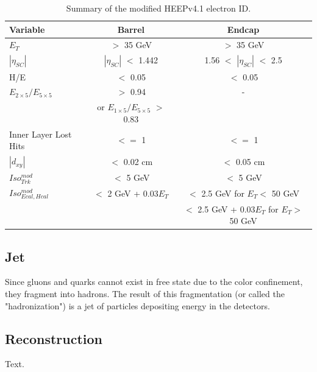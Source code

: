 \begin{table}[hbtp]
  \begin{center}
    \begin{tabular}{|l|c|c|}
      \hline
      Variable & Barrel & Endcap \\\hline
      $E_{T}$ & $>$ 35 GeV & $>$ 35 GeV \\
      $|\eta_{SC}|$ & $|\eta_{SC}|$ $<$ 1.442 & 1.56 $<$ $|\eta_{SC}|$ $<$ 2.5 \\
      H/E & $<$ 0.05 & $<$ 0.05 \\ 
      $E_{2\times5}/E_{5\times5}$ & $>$ 0.94 & - \\
      & or $E_{1\times5}/E_{5\times5}$ $>$ 0.83 & \\ 
      Inner Layer Lost Hits & $<=$ 1 & $<=$ 1 \\
      $|d_{xy}|$ & $<$ 0.02 cm & $<$ 0.05 cm\\
      \hline
      $Iso_{Trk}^{mod}$  & $<$ 5 GeV& $<$ 5 GeV\\
      \hline
      $Iso_{Ecal, Hcal}^{mod}$  & $<$ 2 GeV + 0.03$E_{T}$ & $<$ 2.5 GeV for $E_{T} <$ 50 GeV \\
      & & $<$ 2.5 GeV + 0.03$E_{T}$ for $E_{T} >$ 50 GeV \\
      \hline
    \end{tabular}
    \caption{\label{tab:EleIDtable} Summary of the modified HEEPv4.1 electron ID.}
  \end{center}
\end{table}

\newpage
\subsection{Jet}
Since gluons and quarks cannot exist in free state due to the color confinement\cite{confinement}, they fragment into hadrons. The result of this fragmentation (or called the "hadronization") is a jet of particles depositing energy in the detectors.

\subsection*{Reconstruction}
Text.\cite{PFalgo}

